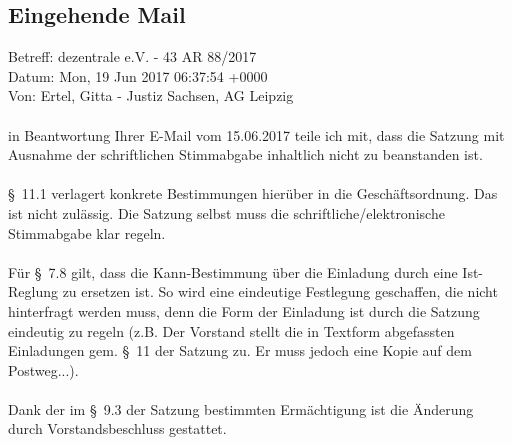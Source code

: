 \documentclass[10pt,a4paper]{scrartcl}
\newcommand{\qs}[1]{\glqq#1\grqq}
\begin{document}
\subsection*{Eingehende Mail}
	Betreff:     dezentrale e.V. - 43 AR 88/2017\\
	Datum:     Mon, 19 Jun 2017 06:37:54 +0000\\
	Von:     Ertel, Gitta - Justiz Sachsen, AG Leipzig\\\\
		in Beantwortung Ihrer E-Mail vom 15.06.2017 teile ich mit, dass die Satzung mit
		Ausnahme der schriftlichen Stimmabgabe inhaltlich nicht zu beanstanden ist.\\\\
		\S\ 11.1 verlagert konkrete Bestimmungen hier{\"u}ber in die Gesch{\"a}ftsordnung.
		Das ist nicht zul{\"a}ssig. Die Satzung selbst muss die schriftliche/elektronische
		Stimmabgabe klar regeln.\\\\
		F{\"u}r \S\ 7.8 gilt, dass die \qs{Kann}-Bestimmung {\"u}ber die Einladung durch
		eine \qs{Ist}-Reglung zu ersetzen ist. So wird eine eindeutige Festlegung geschaffen,
		die nicht hinterfragt werden muss, denn die Form der Einladung ist durch die Satzung
		eindeutig zu regeln (z.B. Der Vorstand stellt die in Textform abgefassten Einladungen
		gem. \S\ 11 der Satzung zu. Er muss jedoch eine Kopie auf dem Postweg...).\\\\
		Dank der im \S\ 9.3 der Satzung bestimmten Erm{\"a}chtigung ist die {\"A}nderung
		durch Vorstandsbeschluss gestattet.
\end{document}
